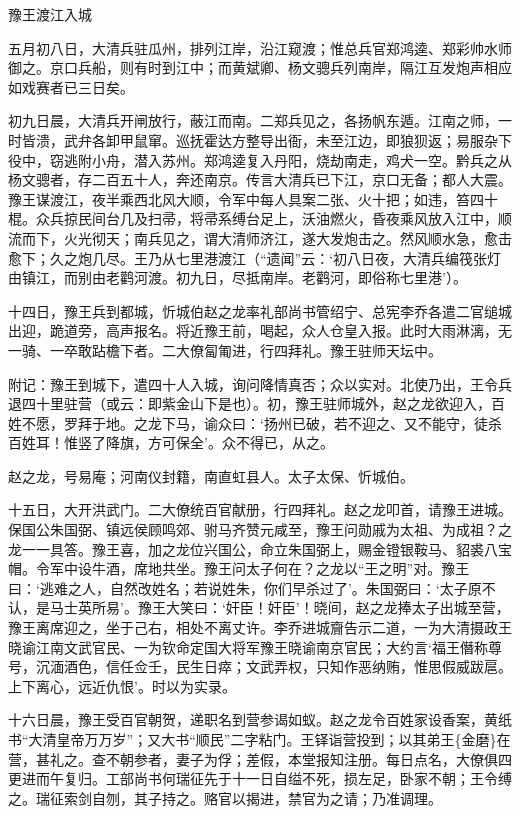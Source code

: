\documentclass[]{article}
\begin{document}
豫王渡江入城

五月初八日，大清兵驻瓜州，排列江岸，沿江窥渡；惟总兵官郑鸿逵、郑彩帅水师御之。京口兵船，则有时到江中；而黄斌卿、杨文骢兵列南岸，隔江互发炮声相应如戏赛者已三日矣。

初九日晨，大清兵开闸放行，蔽江而南。二郑兵见之，各扬帆东遁。江南之师，一时皆溃，武弁各卸甲鼠窜。巡抚霍达方整导出衙，未至江边，即狼狈返；易服杂下役中，窃逃附小舟，潜入苏州。郑鸿逵复入丹阳，烧劫南走，鸡犬一空。黔兵之从杨文骢者，存二百五十人，奔还南京。传言大清兵已下江，京口无备；都人大震。豫王谋渡江，夜半乘西北风大顺，令军中每人具案二张、火十把；如违，笞四十棍。众兵掠民间台几及扫帚，将帚系缚台足上，沃油燃火，昏夜乘风放入江中，顺流而下，火光彻天；南兵见之，谓大清师济江，遂大发炮击之。然风顺水急，愈击愈下；久之炮几尽。王乃从七里港渡江（``遗闻''云：`初八日夜，大清兵编筏张灯由镇江，而别由老鹳河渡。初九日，尽抵南岸。老鹳河，即俗称七里港'）。

十四日，豫王兵到都城，忻城伯赵之龙率礼部尚书管绍宁、总宪李乔各遣二官缒城出迎，跪道旁，高声报名。将近豫王前，喝起，众人仓皇入报。此时大雨淋漓，无一骑、一卒敢跕檐下者。二大僚匐匍进，行四拜礼。豫王驻师天坛中。

附记：豫王到城下，遣四十人入城，询问降情真否；众以实对。北使乃出，王令兵退四十里驻营（或云：即紫金山下是也）。初，豫王驻师城外，赵之龙欲迎入，百姓不愿，罗拜于地。之龙下马，谕众曰：`扬州已破，若不迎之、又不能守，徒杀百姓耳！惟竖了降旗，方可保全'。众不得已，从之。

赵之龙，号易庵；河南仪封籍，南直虹县人。太子太保、忻城伯。

十五日，大开洪武门。二大僚统百官献册，行四拜礼。赵之龙叩首，请豫王进城。保国公朱国弼、镇远侯顾鸣郊、驸马齐赞元咸至，豫王问勋戚为太祖、为成祖？之龙一一具答。豫王喜，加之龙位兴国公，命立朱国弼上，赐金镫银鞍马、貂裘八宝帽。令军中设牛酒，席地共坐。豫王问太子何在？之龙以``王之明''对。豫王曰：`逃难之人，自然改姓名；若说姓朱，你们早杀过了'。朱国弼曰：`太子原不认，是马士英所易'。豫王大笑曰：`奸臣！奸臣'！晓间，赵之龙捧太子出城至营，豫王离席迎之，坐于己右，相处不离丈许。李乔进城齎告示二道，一为大清摄政王晓谕江南文武官民、一为钦命定国大将军豫王晓谕南京官民；大约言`福王僭称尊号，沉湎酒色，信任佥壬，民生日瘁；文武弄权，只知作恶纳贿，惟思假威跋扈。上下离心，远近仇恨'。时以为实录。

十六日晨，豫王受百官朝贺，递职名到营参谒如蚁。赵之龙令百姓家设香案，黄纸书``大清皇帝万万岁''；又大书``顺民''二字粘门。王铎诣营投到；以其弟王\{金磨\}在营，甚礼之。查不朝参者，妻子为俘；差假，本堂报知注册。每日点名，大僚俱四更进而午复归。工部尚书何瑞征先于十一日自缢不死，损左足，卧家不朝；王令缚之。瑞征索剑自刎，其子持之。赂官以揭进，禁官为之请；乃准调理。
\end{document}

